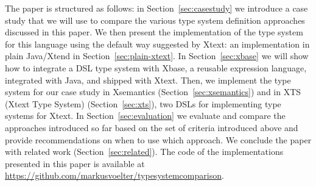 The paper is structured as follows: in Section~\ref{sec:casestudy} we
introduce a case study that we will use to compare the various type system definition approaches discussed in this paper.
We then
present the implementation of the type system for this language using the
default way suggested by Xtext: an implementation in plain Java/Xtend 
in Section~\ref{sec:plain-xtext}. In Section~\ref{sec:xbase} we will show how to
integrate a DSL type system with Xbase, a reusable expression language, integrated
with Java, and shipped with Xtext. Then, we implement
the type system for our case study in Xsemantics (Section~\ref{sec:xsemantics}) and 
in XTS (Xtext Type System) (Section~\ref{sec:xts}), two DSLs for implementing
type systems for Xtext. In Section~\ref{sec:evaluation} we evaluate and compare
the approaches introduced so far based on the set of criteria introduced above
and provide recommendations on when to use which approach.  We conclude the paper
with related work (Section~\ref{sec:related}).
The
code of the implementations presented in this paper is available at \\
\url{https://github.com/markusvoelter/typesystemcomparison}.

\endinput

\subsection{Type Systems}

Every language development environment comes with a facility for checking
constraints. A \emph{constraint} is essentially a Boolean expression over parts
of a model. For the model to be valid, all constraints applicable to a model
must evaluate to \emph{true}. Type checking, however, is more than simple
constraint checks. In order to use constraints to check if a type is valid,
that type (and all other types in the model) first have to be calculated. For
non-trivial languages, type computation can be quite elaborate. The main
contribution of type system implementation tools hence is the computation of the
type of program elements. The type system is then integrated with the constraint
checking facilities to perform the actual type checks. More specifically, a type
system facility has to support the following functionalities:

